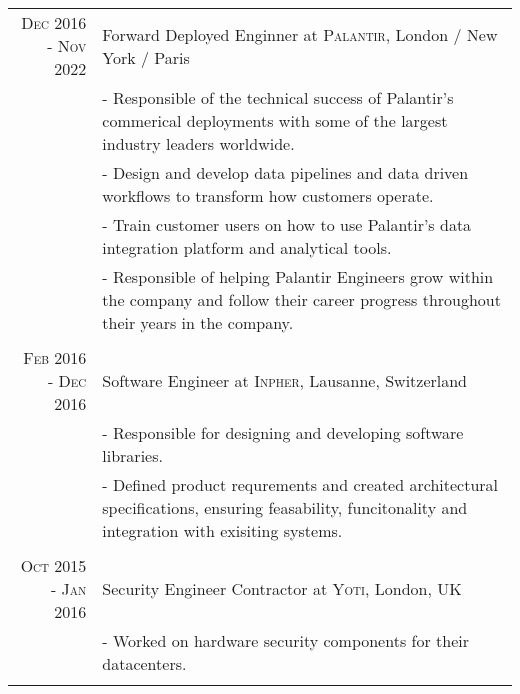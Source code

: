 \documentclass[a4paper,10pt]{article} %
\begin{document}
\begin{tabular}{r|p{11cm}}
    \textsc{Dec 2016 - Nov 2022} & Forward Deployed Enginner at \textsc{Palantir}, London / New York / Paris\\
                            & \footnotesize{
                                - Responsible of the technical success of Palantir's commerical deployments with some of the largest industry leaders worldwide.
                            }\\
                            & \footnotesize{
                                - Design and develop data pipelines and data driven workflows to transform how customers operate.
                            }\\
                            & \footnotesize{
                                - Train customer users on how to use Palantir's data integration platform and analytical tools.
                            }\\
                            & \footnotesize{
                                - Responsible of helping Palantir Engineers grow within the company and follow their career progress throughout their years in the company.
                            }\\
\multicolumn{2}{c}{} \\
    \textsc{Feb 2016 - Dec 2016} & Software Engineer at \textsc{Inpher}, Lausanne, Switzerland\\
                                & \footnotesize{
                                    - Responsible for designing and developing software libraries.
                                }\\
                                & \footnotesize{
                                    - Defined product requrements and created architectural specifications, ensuring feasability, funcitonality and integration
                                    with exisiting systems.
                                }\\
\multicolumn{2}{c}{} \\
    \textsc{Oct 2015 - Jan 2016} & Security Engineer Contractor at \textsc{Yoti}, London, UK\\
                              & \footnotesize{
                                  - Worked on hardware security components for their datacenters.}\\
\multicolumn{2}{c}{} \\


\end{tabular}
\end{document}
